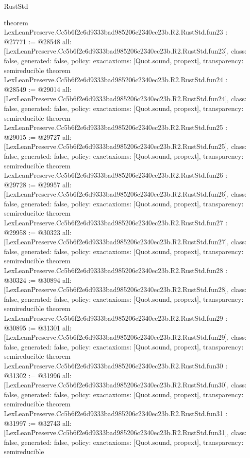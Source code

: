 \begin{lexlean}{RustStd}
\begin{coremodule}
{}
theorem LexLeanPreserve.Cc5b6f2e6d9333bad985206c2340ec23b.R2.RustStd.fun23 : @27771 := @28548 {
  all: [LexLeanPreserve.Cc5b6f2e6d9333bad985206c2340ec23b.R2.RustStd.fun23],
  class: false,
  generated: false,
  policy: exact{axioms: [Quot.sound, propext]},
  transparency: semireducible
}
theorem LexLeanPreserve.Cc5b6f2e6d9333bad985206c2340ec23b.R2.RustStd.fun24 : @28549 := @29014 {
  all: [LexLeanPreserve.Cc5b6f2e6d9333bad985206c2340ec23b.R2.RustStd.fun24],
  class: false,
  generated: false,
  policy: exact{axioms: [Quot.sound, propext]},
  transparency: semireducible
}
theorem LexLeanPreserve.Cc5b6f2e6d9333bad985206c2340ec23b.R2.RustStd.fun25 : @29015 := @29727 {
  all: [LexLeanPreserve.Cc5b6f2e6d9333bad985206c2340ec23b.R2.RustStd.fun25],
  class: false,
  generated: false,
  policy: exact{axioms: [Quot.sound, propext]},
  transparency: semireducible
}
theorem LexLeanPreserve.Cc5b6f2e6d9333bad985206c2340ec23b.R2.RustStd.fun26 : @29728 := @29957 {
  all: [LexLeanPreserve.Cc5b6f2e6d9333bad985206c2340ec23b.R2.RustStd.fun26],
  class: false,
  generated: false,
  policy: exact{axioms: [Quot.sound, propext]},
  transparency: semireducible
}
theorem LexLeanPreserve.Cc5b6f2e6d9333bad985206c2340ec23b.R2.RustStd.fun27 : @29958 := @30323 {
  all: [LexLeanPreserve.Cc5b6f2e6d9333bad985206c2340ec23b.R2.RustStd.fun27],
  class: false,
  generated: false,
  policy: exact{axioms: [Quot.sound, propext]},
  transparency: semireducible
}
theorem LexLeanPreserve.Cc5b6f2e6d9333bad985206c2340ec23b.R2.RustStd.fun28 : @30324 := @30894 {
  all: [LexLeanPreserve.Cc5b6f2e6d9333bad985206c2340ec23b.R2.RustStd.fun28],
  class: false,
  generated: false,
  policy: exact{axioms: [Quot.sound, propext]},
  transparency: semireducible
}
theorem LexLeanPreserve.Cc5b6f2e6d9333bad985206c2340ec23b.R2.RustStd.fun29 : @30895 := @31301 {
  all: [LexLeanPreserve.Cc5b6f2e6d9333bad985206c2340ec23b.R2.RustStd.fun29],
  class: false,
  generated: false,
  policy: exact{axioms: [Quot.sound, propext]},
  transparency: semireducible
}
theorem LexLeanPreserve.Cc5b6f2e6d9333bad985206c2340ec23b.R2.RustStd.fun30 : @31302 := @31996 {
  all: [LexLeanPreserve.Cc5b6f2e6d9333bad985206c2340ec23b.R2.RustStd.fun30],
  class: false,
  generated: false,
  policy: exact{axioms: [Quot.sound, propext]},
  transparency: semireducible
}
theorem LexLeanPreserve.Cc5b6f2e6d9333bad985206c2340ec23b.R2.RustStd.fun31 : @31997 := @32743 {
  all: [LexLeanPreserve.Cc5b6f2e6d9333bad985206c2340ec23b.R2.RustStd.fun31],
  class: false,
  generated: false,
  policy: exact{axioms: [Quot.sound, propext]},
  transparency: semireducible
}
\end{coremodule}
\end{lexlean}
